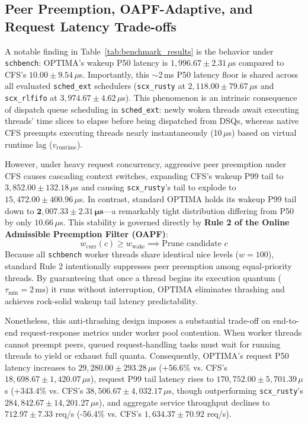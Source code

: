 \documentclass[letterpaper,twocolumn,10pt]{article}
\begin{document}
\subsection{Peer Preemption, OAPF-Adaptive, and Request Latency Trade-offs}
A notable finding in Table~\ref{tab:benchmark_results} is the behavior under \texttt{schbench}: OPTIMA's wakeup P50 latency is $1{,}996.67 \pm 2.31\,\mu$s compared to CFS's $10.00 \pm 9.54\,\mu$s. Importantly, this $\sim$2\,ms P50 latency floor is shared across all evaluated \texttt{sched\_ext} schedulers (\texttt{scx\_rusty} at $2{,}118.00 \pm 79.67\,\mu$s and \texttt{scx\_rlfifo} at $3{,}974.67 \pm 4.62\,\mu$s). This phenomenon is an intrinsic consequence of dispatch queue scheduling in \texttt{sched\_ext}: newly woken threads await executing threads' time slices to elapse before being dispatched from DSQs, whereas native CFS preempts executing threads nearly instantaneously (10\,$\mu$s) based on virtual runtime lag ($v_{\text{runtime}}$).

However, under heavy request concurrency, aggressive peer preemption under CFS causes cascading context switches, expanding CFS's wakeup P99 tail to $3{,}852.00 \pm 132.18\,\mu$s and causing \texttt{scx\_rusty}'s tail to explode to $15{,}472.00 \pm 400.96\,\mu$s. In contrast, standard OPTIMA holds its wakeup P99 tail down to $\mathbf{2{,}007.33 \pm 2.31\,\mu\text{s}}$---a remarkably tight distribution differing from P50 by only $10.66\,\mu$s. This stability is governed directly by \textbf{Rule 2 of the Online Admissible Preemption Filter (OAPF)}:
\begin{equation*}
w_{\mathrm{curr}}(c) \ge w_{\mathrm{wake}} \implies \text{Prune candidate } c
\end{equation*}
Because all \texttt{schbench} worker threads share identical nice levels ($w = 100$), standard Rule 2 intentionally suppresses peer preemption among equal-priority threads. By guaranteeing that once a thread begins its execution quantum ($\tau_{\min} = 2\,\text{ms}$) it runs without interruption, OPTIMA eliminates thrashing and achieves rock-solid wakeup tail latency predictability.

Nonetheless, this anti-thrashing design imposes a substantial trade-off on end-to-end request-response metrics under worker pool contention. When worker threads cannot preempt peers, queued request-handling tasks must wait for running threads to yield or exhaust full quanta. Consequently, OPTIMA's request P50 latency increases to $29{,}280.00 \pm 293.28\,\mu$s (+56.6\% vs. CFS's $18{,}698.67 \pm 1{,}420.07\,\mu$s), request P99 tail latency rises to $170{,}752.00 \pm 5{,}701.39\,\mu$s (+343.4\% vs. CFS's $38{,}506.67 \pm 4{,}032.17\,\mu$s, though outperforming \texttt{scx\_rusty}'s $284{,}842.67 \pm 14{,}201.27\,\mu$s), and aggregate service throughput declines to $712.97 \pm 7.33$ req/s (-56.4\% vs. CFS's $1{,}634.37 \pm 70.92$ req/s). 
\end{document}
